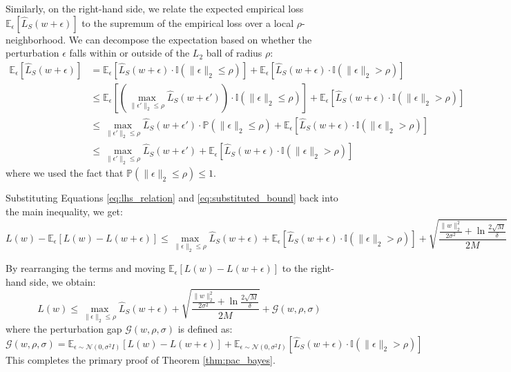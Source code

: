 \documentclass{article}
\theoremstyle{plain}
\theoremstyle{definition}
\theoremstyle{remark}
\begin{document}
Similarly, on the right-hand side, we relate the expected empirical loss $\mathbb{E}_{\epsilon} [\widehat{L}_S(w + \epsilon)]$ to the supremum of the empirical loss over a local $\rho$-neighborhood. We can decompose the expectation based on whether the perturbation $\epsilon$ falls within or outside of the $L_2$ ball of radius $\rho$:
\begin{align}
    \mathbb{E}_{\epsilon} [\widehat{L}_S(w + \epsilon)] &= \mathbb{E}_{\epsilon} \left[ \widehat{L}_S(w + \epsilon) \cdot \mathbb{I}(\|\epsilon\|_2 \le \rho) \right] + \mathbb{E}_{\epsilon} \left[ \widehat{L}_S(w + \epsilon) \cdot \mathbb{I}(\|\epsilon\|_2 > \rho) \right] \nonumber \\
    &\le \mathbb{E}_{\epsilon} \left[ \left( \max_{\|\epsilon'\|_2 \le \rho} \widehat{L}_S(w + \epsilon') \right) \cdot \mathbb{I}(\|\epsilon\|_2 \le \rho) \right] + \mathbb{E}_{\epsilon} \left[ \widehat{L}_S(w + \epsilon) \cdot \mathbb{I}(\|\epsilon\|_2 > \rho) \right] \nonumber \\
    &\le \max_{\|\epsilon'\|_2 \le \rho} \widehat{L}_S(w + \epsilon') \cdot \mathbb{P}(\|\epsilon\|_2 \le \rho) + \mathbb{E}_{\epsilon} \left[ \widehat{L}_S(w + \epsilon) \cdot \mathbb{I}(\|\epsilon\|_2 > \rho) \right] \nonumber \\
    &\le \max_{\|\epsilon'\|_2 \le \rho} \widehat{L}_S(w + \epsilon') + \mathbb{E}_{\epsilon} \left[ \widehat{L}_S(w + \epsilon) \cdot \mathbb{I}(\|\epsilon\|_2 > \rho) \right]
\end{align}
where we used the fact that $\mathbb{P}(\|\epsilon\|_2 \le \rho) \le 1$.

Substituting Equations \eqref{eq:lhs_relation} and \eqref{eq:substituted_bound} back into the main inequality, we get:
\begin{equation}
    L(w) - \mathbb{E}_{\epsilon} [L(w) - L(w + \epsilon)] \le \max_{\|\epsilon\|_2 \le \rho} \widehat{L}_{S}(w + \epsilon) + \mathbb{E}_{\epsilon} [\widehat{L}_S(w + \epsilon) \cdot \mathbb{I}(\|\epsilon\|_2 > \rho)] + \sqrt{\frac{\frac{\|w\|_2^2}{2\sigma^2} + \ln \frac{2\sqrt{M}}{\delta}}{2M}}
\end{equation}

By rearranging the terms and moving $\mathbb{E}_{\epsilon} [L(w) - L(w + \epsilon)]$ to the right-hand side, we obtain:
\begin{equation}
    L(w) \le \max_{\|\epsilon\|_2 \le \rho} \widehat{L}_{S}(w + \epsilon) + \sqrt{\frac{\frac{\|w\|_2^2}{2\sigma^2} + \ln \frac{2\sqrt{M}}{\delta}}{2M}} + \mathcal{G}(w, \rho, \sigma)
\end{equation}
where the perturbation gap $\mathcal{G}(w, \rho, \sigma)$ is defined as:
\begin{equation}
    \mathcal{G}(w, \rho, \sigma) = \mathbb{E}_{\epsilon \sim \mathcal{N}(0, \sigma^2 I)} [L(w) - L(w + \epsilon)] + \mathbb{E}_{\epsilon \sim \mathcal{N}(0, \sigma^2 I)} [\widehat{L}_S(w + \epsilon) \cdot \mathbb{I}(\|\epsilon\|_2 > \rho)]
\end{equation}
This completes the primary proof of Theorem \ref{thm:pac_bayes}.
\end{document}
